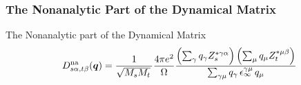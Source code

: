 \begin{frame}
  \frametitle{The Nonanalytic Part of the Dynamical Matrix}
  The Nonanalytic part of the Dynamical Matrix
  \begin{equation*}
    \mathcolor{black}{
      D^{\text{na}}_{s\alpha,t\beta}(\boldsymbol{q})
    }
    =
    {1\over\sqrt{M_sM_t}\,}
    {4\pi e^2\over\Omega}
    \frac{
      \left(
        \sum_{\gamma} q_\gamma Z^{*\gamma\alpha}_s
      \right) 
      \left(
      \sum_{\mu} q_\mu Z^{*\mu\beta}_t
      \right) 
    }{
      \sum_{\gamma\mu} q_\gamma \, \epsilon_\infty^{\gamma\mu} \,q_\mu 
    }
  \end{equation*}

\end{frame}


